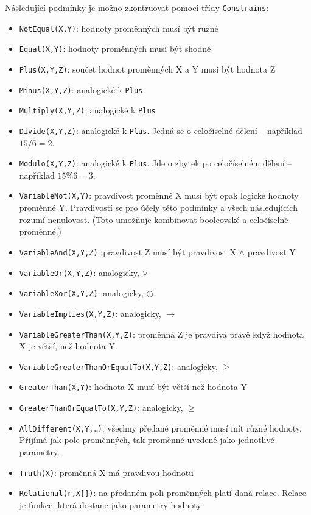 \documentclass[a4paper]{article}
\begin{document}
Následující podmínky je možno zkontruovat pomocí třídy \texttt{Constrains}:
\begin{itemize}
\item
	\texttt{NotEqual(X,Y)}: hodnoty proměnných musí být různé
\item
	\texttt{Equal(X,Y)}: hodnoty proměnných musí být shodné
\item
	\texttt{Plus(X,Y,Z)}: součet hodnot proměnných X a Y musí být hodnota Z
\item
	\texttt{Minus(X,Y,Z)}: analogické k \texttt{Plus}
\item
	\texttt{Multiply(X,Y,Z)}: analogické k \texttt{Plus}
\item
	\texttt{Divide(X,Y,Z)}: analogické k \texttt{Plus}. Jedná se o
	celočíselné dělení -- například $15 / 6 = 2$.
\item
	\texttt{Modulo(X,Y,Z)}: analogické k \texttt{Plus}. Jde o zbytek po
	celočíselném dělení -- například $15 \% 6 = 3$.
\item
	\texttt{VariableNot(X,Y)}: pravdivost proměnné X musí být opak
	logické hodnoty proměnné Y. Pravdivostí se pro účely této podmínky
	a všech následujících rozumí nenulovost. (Toto umožňuje kombinovat
	booleovské a celočíselné proměnné.)
\item
	\texttt{VariableAnd(X,Y,Z)}: pravdivost Z musí být pravdivost X $\wedge$
	pravdivost Y
\item
	\texttt{VariableOr(X,Y,Z)}: analogicky, $\vee$
\item
	\texttt{VariableXor(X,Y,Z)}: analogicky, $\oplus$
\item
	\texttt{VariableImplies(X,Y,Z)}: analogicky, $\rightarrow$
\item
	\texttt{VariableGreaterThan(X,Y,Z)}: proměnná Z je pravdivá právě když
	hodnota X je větší, než hodnota Y.
\item
	\texttt{VariableGreaterThanOrEqualTo(X,Y,Z)}: analogicky, $\geq$
\item
	\texttt{GreaterThan(X,Y)}: hodnota X musí být větší než hodnota Y
\item
	\texttt{GreaterThanOrEqualTo(X,Y,Z)}: analogicky, $\geq$
\item
	\texttt{AllDifferent(X,Y,\ldots)}: všechny předané proměnné musí mít
	různé hodnoty. Přijímá jak pole proměnných, tak proměnné uvedené jako
	jednotlivé parametry.
\item
	\texttt{Truth(X)}: proměnná X má pravdivou hodnotu
\item
	\texttt{Relational(r,X[])}: na předaném poli proměnných platí daná
	relace. Relace je funkce, která dostane jako parametry hodnoty

\end{itemize}
\end{document}
